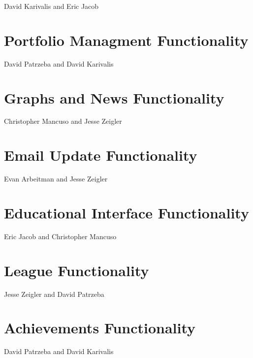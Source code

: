 \documentclass[11pt,letterpaper,oneside]{memoir}
\begin{document}
David Karivalis and Eric Jacob

\section{Portfolio Managment Functionality}

David Patrzeba and David Karivalis

\section{Graphs and News Functionality}

Christopher Mancuso and Jesse Zeigler

\section{Email Update Functionality}

Evan Arbeitman and Jesse Zeigler

\section{Educational Interface Functionality}

Eric Jacob and Christopher Mancuso

\section{League Functionality}

Jesse Zeigler and David Patrzeba

\section{Achievements Functionality}

David Patrzeba and David Karivalis
\end{document}
